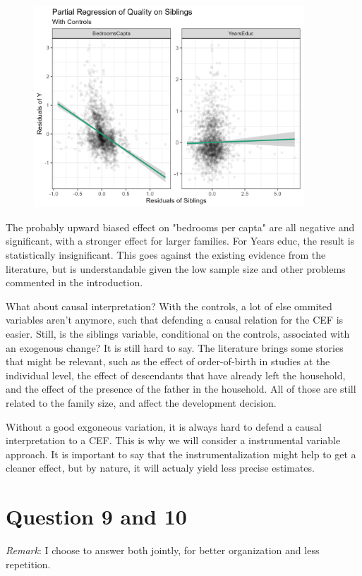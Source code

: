\documentclass[12pt]{article}
\begin{document}
\begin{figure}[!htbp]
    \centering
    \includegraphics[width=0.9\textwidth]{Figures/quality_controls.png}
    \label{fig:quality_controls}
\end{figure}

The probably upward biased effect on "bedrooms per capta" are all negative and significant, with a stronger effect for larger families. For Years educ, the result is statistically insignificant. This goes against the existing evidence from the literature, but is understandable given the low sample size and other problems commented in the introduction.

What about causal interpretation? With the controls, a lot of else ommited variables aren't anymore, such that defending a causal relation for the CEF is easier. Still, is the siblings variable, conditional on the controls, associated with an exogenous change? It is still hard to say. The literature brings some stories that might be relevant, such as the effect of order-of-birth in studies at the individual level, the effect of descendants that have already left the household, and the effect of the presence of the father in the household. All of those are still related to the family size, and affect the development decision.

Without a good exgoneous variation, it is always hard to defend a causal interpretation to a CEF. This is why we will consider a instrumental variable approach. It is important to say that the instrumentalization might help to get a cleaner effect, but by nature, it will actualy yield less precise estimates.


\section*{Question 9 and 10}
\textit{Remark}: I choose to answer both jointly, for better organization and less repetition.
\end{document}
